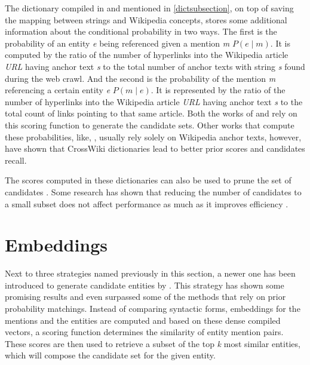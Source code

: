 The dictionary compiled in \cite{spitkovsky-chang-2012-cross} and mentioned in \ref{dictsubsection}, on top of saving the mapping between strings and Wikipedia concepts, stores some additional information about the conditional probability in two ways. The first is the probability of an entity \textit{e} being referenced given a mention \textit{m} $P(\textit{e} \mid \textit{m})$. It is computed by the ratio of the number of hyperlinks into the Wikipedia article \textit{URL} having anchor text \textit{s}  to the total number of anchor texts with string \textit{s} found during the web crawl. And the second is the probability of the mention \textit{m} referencing a certain entity \textit{e} $P(\textit{m} \mid \textit{e})$. It is represented by the ratio of the number of hyperlinks into the Wikipedia article \textit{URL} having anchor text \textit{s} to the total count of links pointing to that same article. Both the works of \cite{Gupta2017} and \cite{Ganea2017} rely on this scoring function to generate the candidate sets.
Other works that compute these probabilities, like, \cite{ratinov-etal-2011-local} \cite{hoffart-etal-2011-robust}, usually rely solely on Wikipedia anchor texts, however, \cite{ling-etal-2015-design} have shown that CrossWiki dictionaries lead to better prior scores and candidates recall. \newline

The scores computed in these dictionaries can also be used to prune the set of candidates \cite{Fang2020}. Some research has shown that reducing the number of candidates to a small subset does not affect performance as much as it improves efficiency \cite{Gupta2017}.

\section{Embeddings}
Next to three strategies named previously in this section, a newer one has been introduced to generate candidate entities by \cite{Gillick2019}. This strategy has shown some promising results and even surpassed some of the methods that rely on prior probability matchings. Instead of comparing syntactic forms, embeddings for the mentions and the entities are computed and based on these dense compiled vectors, a scoring function determines the similarity of entity mention pairs. These scores are then used to retrieve a subset of the top \textit{k} most similar entities, which will compose the candidate set for the given entity.

